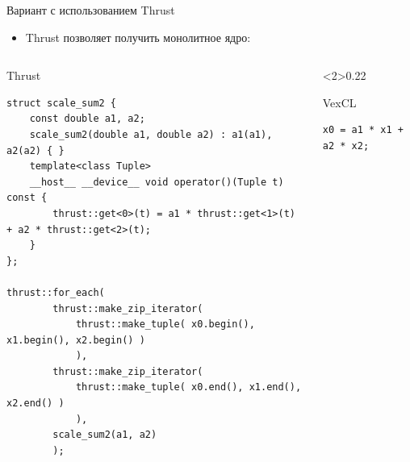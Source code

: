 \documentclass[@BEAMER_OPTIONS@]{beamer}
\begin{document}
\begin{frame}[fragile]{Вариант с использованием Thrust}
    \begin{itemize}
        \item Thrust позволяет получить монолитное ядро:
    \end{itemize}
    \begin{columns}
        \begin{column}{0.70\textwidth}
            \begin{exampleblock}{Thrust}
                \begin{adjustbox}{width=0.95\textwidth,height=0.6\textheight,keepaspectratio}
                    \begin{lstlisting}
struct scale_sum2 {
    const double a1, a2;
    scale_sum2(double a1, double a2) : a1(a1), a2(a2) { }
    template<class Tuple>
    __host__ __device__ void operator()(Tuple t) const {
        thrust::get<0>(t) = a1 * thrust::get<1>(t) + a2 * thrust::get<2>(t);
    }
};

thrust::for_each(
        thrust::make_zip_iterator(
            thrust::make_tuple( x0.begin(), x1.begin(), x2.begin() )
            ),
        thrust::make_zip_iterator(
            thrust::make_tuple( x0.end(), x1.end(), x2.end() )
            ),
        scale_sum2(a1, a2)
        );
                    \end{lstlisting}
                \end{adjustbox}
            \end{exampleblock}
        \end{column}
        \begin{column}<2>{0.22\textwidth}
            \begin{exampleblock}{VexCL}
                \begin{adjustbox}{width=0.95\textwidth,height=0.6\textheight,keepaspectratio}
                    \begin{lstlisting}
x0 = a1 * x1 + a2 * x2;
                    \end{lstlisting}
                \end{adjustbox}
            \end{exampleblock}
        \end{column}
    \end{columns}
\end{frame}
\end{document}
